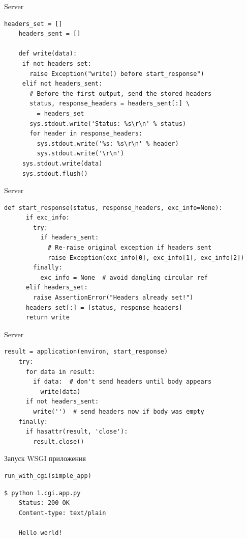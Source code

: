 \begin{frame}[fragile]{Server}

    \begin{lstlisting}[style=python]
    headers_set = []
    headers_sent = []

    def write(data):
     if not headers_set:
       raise Exception("write() before start_response")
     elif not headers_sent:
       # Before the first output, send the stored headers
       status, response_headers = headers_sent[:] \
         = headers_set
       sys.stdout.write('Status: %s\r\n' % status)
       for header in response_headers:
         sys.stdout.write('%s: %s\r\n' % header)
         sys.stdout.write('\r\n')
     sys.stdout.write(data)
     sys.stdout.flush()
    \end{lstlisting}

\end{frame}

\begin{frame}[fragile]{Server}

    \begin{lstlisting}[style=python]
    def start_response(status, response_headers, exc_info=None):
      if exc_info:
        try:
          if headers_sent:
            # Re-raise original exception if headers sent
            raise Exception(exc_info[0], exc_info[1], exc_info[2])
        finally:
          exc_info = None  # avoid dangling circular ref
      elif headers_set:
        raise AssertionError("Headers already set!")
      headers_set[:] = [status, response_headers]
      return write
    \end{lstlisting}

\end{frame}

\begin{frame}[fragile]{Server}

    \begin{lstlisting}[style=python]
    result = application(environ, start_response)
    try:
      for data in result:
        if data:  # don't send headers until body appears
          write(data)
      if not headers_sent:
        write('')  # send headers now if body was empty
    finally:
      if hasattr(result, 'close'):
        result.close()
    \end{lstlisting}

\end{frame}

\begin{frame}[fragile]{Запуск WSGI приложения}

    \begin{lstlisting}[style=python]
    run_with_cgi(simple_app)
    \end{lstlisting}

    \begin{lstlisting}[style=python]
    $ python 1.cgi.app.py
    Status: 200 OK
    Content-type: text/plain

    Hello world!
    \end{lstlisting}

\end{frame}

